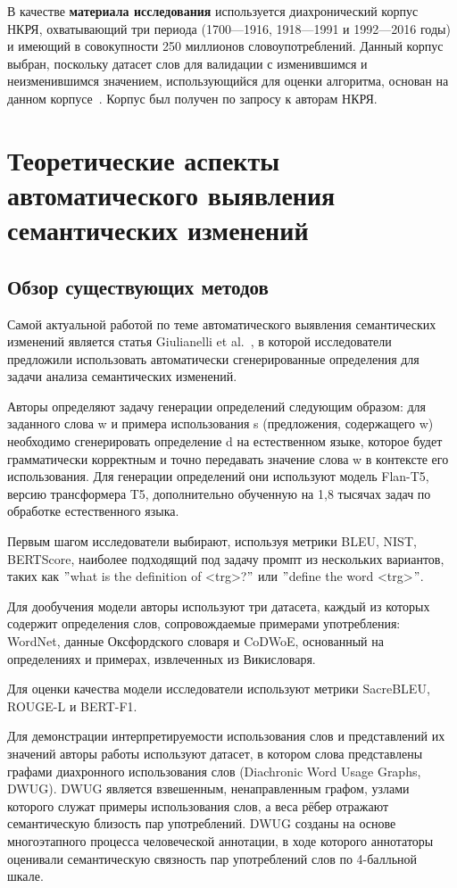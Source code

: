 \documentclass[LI,VKR]{HSEUniversity}
\begin{document}
В качестве \textbf{материала исследования} используется диахронический корпус НКРЯ, охватывающий
три периода (1700—1916, 1918—1991 и 1992—2016 годы) и имеющий в совокупности 250 миллионов
словоупотреблений.
Данный корпус выбран, поскольку датасет слов для валидации с изменившимся и неизменившимся значением,
использующийся для оценки алгоритма, основан на данном корпусе~\cite{rodina2020elmo}.
Корпус был получен по запросу к авторам НКРЯ.

\chapter{Теоретические аспекты автоматического выявления семантических изменений}

\section{Обзор существующих методов}

Самой актуальной работой по теме автоматического выявления семантических изменений является статья
Giulianelli et al.~\cite{DefinitionGenerationMainArticle}, в которой исследователи предложили
использовать автоматически сгенерированные определения для задачи анализа семантических изменений.

Авторы определяют задачу генерации определений следующим образом: для заданного слова w и примера
использования s (предложения, содержащего w) необходимо сгенерировать определение d на
естественном языке, которое будет грамматически корректным и точно передавать значение слова
w в контексте его использования.
Для генерации определений они используют модель Flan-T5, версию трансформера T5,
дополнительно обученную на 1,8 тысячах задач по обработке естественного языка.

Первым шагом исследователи выбирают, используя метрики BLEU, NIST, BERTScore, наиболее
подходящий под задачу промпт из нескольких вариантов, таких как
\("\)what is the definition of <trg>?\("\) или \("\)define the word <trg>\("\).

Для дообучения модели авторы используют три датасета, каждый из которых содержит определения
слов, сопровождаемые примерами употребления: WordNet, данные Оксфордского словаря и CoDWoE,
основанный на определениях и примерах, извлеченных из Викисловаря.

Для оценки качества модели исследователи используют метрики SacreBLEU, ROUGE-L и BERT-F1.

Для демонстрации интерпретируемости использования слов и представлений их значений авторы
работы используют датасет, в котором слова представлены графами диахронного использования
слов (Diachronic Word Usage Graphs, DWUG). DWUG является взвешенным, ненаправленным графом,
узлами которого служат примеры использования слов, а веса рёбер отражают семантическую
близость пар употреблений.
DWUG созданы на основе многоэтапного процесса человеческой аннотации, в ходе которого аннотаторы
оценивали семантическую связность пар употреблений слов по 4-балльной шкале.
\end{document}
